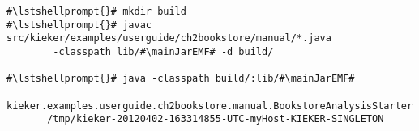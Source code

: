 \begin{lstlisting}[caption=Commands to compile and run the analysis under \UnixLikeSystems{},label=lst:bookstoreAnalysisStarterLinux] 			
#\lstshellprompt{}# mkdir build
#\lstshellprompt{}# javac src/kieker/examples/userguide/ch2bookstore/manual/*.java 
        -classpath lib/#\mainJarEMF# -d build/

#\lstshellprompt{}# java -classpath build/:lib/#\mainJarEMF#
       kieker.examples.userguide.ch2bookstore.manual.BookstoreAnalysisStarter 
       /tmp/kieker-20120402-163314855-UTC-myHost-KIEKER-SINGLETON
\end{lstlisting}	